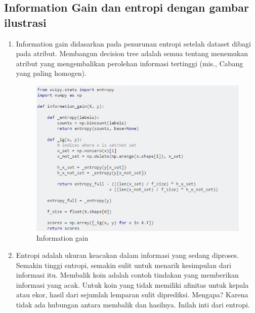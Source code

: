\subsection{Information Gain dan entropi dengan gambar ilustrasi}
\begin{enumerate}
\item Information gain didasarkan pada penurunan entropi setelah dataset dibagi pada atribut. Membangun decision tree adalah semua tentang menemukan atribut yang mengembalikan perolehan informasi tertinggi (mis., Cabang yang paling homogen).
\begin{figure}[ht]
\centering
\includegraphics[scale=0.5]{figures/wiendh7.png}
\caption{Information gain}
\label{contoh}
\end{figure}
\item Entropi adalah ukuran keacakan dalam informasi yang sedang diproses. Semakin tinggi entropi, semakin sulit untuk menarik kesimpulan dari informasi itu. Membalik koin adalah contoh tindakan yang memberikan informasi yang acak. Untuk koin yang tidak memiliki afinitas untuk kepala atau ekor, hasil dari sejumlah lemparan sulit diprediksi. Mengapa? Karena tidak ada hubungan antara membalik dan hasilnya. Inilah inti dari entropi.
\begin{figure}[ht]
\centering

\end{figure}
\end{enumerate}

